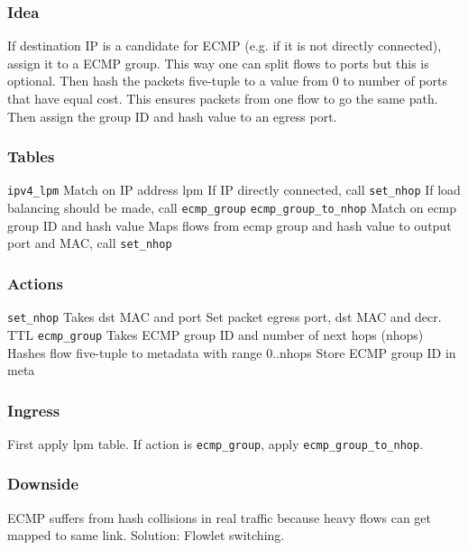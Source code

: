 \documentclass[a4paper, fontsize=8pt, landscape, DIV=1]{scrartcl}
\begin{document}
\begin{multicols*}{4}
  \subsubsection{Idea} If destination IP is a candidate for ECMP (e.g. if it is not directly
  connected), assign it to a ECMP group. This way one can split flows to ports but this is
  optional. Then hash the packets five-tuple to a value from 0 to number of ports that have
  equal cost. This ensures packets from one flow to go the same path. Then assign the group
  ID and hash value to an egress port.

  \subsubsection{Tables} 
  \begin{outline}
  \1 \texttt{ipv4\_lpm} Match on IP address lpm
    \2 If IP directly connected, call \texttt{set\_nhop}
    \2 If load balancing should be made, call \texttt{ecmp\_group}
  \1 \texttt{ecmp\_group\_to\_nhop} Match on ecmp group ID and hash value
    \2 Maps flows from ecmp group and hash value to output port and MAC, call \texttt{set\_nhop}
  \end{outline}
  
  \subsubsection{Actions} 
  \begin{outline}
  \1 \texttt{set\_nhop} Takes dst MAC and port
    \2 Set packet egress port, dst MAC and decr. TTL
  \1 \texttt{ecmp\_group} Takes ECMP group ID and number of next hops (nhops)
    \2 Hashes flow five-tuple to metadata with range 0..nhops
    \2 Store ECMP group ID in meta
  \end{outline}
  
  \subsubsection{Ingress} First apply lpm table. If action is \texttt{ecmp\_group}, apply
  \texttt{ecmp\_group\_to\_nhop}.
  
  \subsubsection{Downside} ECMP suffers from hash collisions in real traffic because heavy 
  flows can get mapped to same link. Solution: Flowlet switching.



\end{multicols*}
\end{document}
